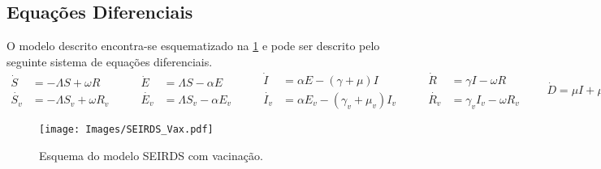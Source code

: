 \subsection{Equações Diferenciais}
O modelo descrito encontra-se esquematizado na \ref{fig:ModelVax} e pode ser descrito pelo seguinte sistema de equações diferenciais.
\begin{equation*}
        \begin{aligned}
                \Dot{S}   &= - \Lambda S + \omega R
                \\
                \Dot{S_v} &= - \Lambda S_v + \omega R_v
        \end{aligned}\qquad
        \begin{aligned}
                \Dot{E}   &= \Lambda S - \alpha E
                \\
                \Dot{E_v} &= \Lambda S_v - \alpha E_v
        \end{aligned}\qquad
        \begin{aligned}
                \Dot{I}   &= \alpha E   - (\gamma   + \mu)   I
                \\
                \Dot{I_v} &= \alpha E_v - (\gamma_v + \mu_v) I_v
        \end{aligned}\qquad
        \begin{aligned}
                \Dot{R}   &= \gamma I     - \omega R
                \\
                \Dot{R_v} &= \gamma_v I_v - \omega R_v
        \end{aligned}\qquad
        \Dot{D} = \mu I + \mu_v I_v
\end{equation*}

\begin{figure}[H]\centering
        \texttt{[image: Images/SEIRDS\_Vax.pdf]}
        \caption{Esquema do modelo SEIRDS com vacinação.}
\label{fig:ModelVax}\end{figure}
